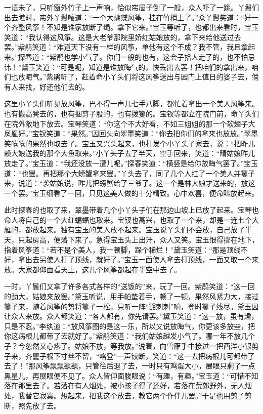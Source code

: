 \documentclass[12pt,oneside]{book}
\begin{document}
一语未了，只听窗外竹子上一声响，恰似帘屉子倒了一般，众人吓了一跳。丫鬟们出去瞧时，帘外丫鬟嚷道：“一个大蝴蝶风筝，挂在竹梢上了。”众丫鬟笑道：“好一个齐整风筝！不知是谁家放断了绳。拿下它来。”宝玉等听了，也都出来看时，宝玉笑道：“我认得这风筝。这是大老爷那院里娇红姑娘放的，拿下来给他送过去罢。”紫鹃笑道：“难道天下没有一样的风筝，单他有这个不成？我不管，我且拿起来。”探春道：“紫鹃也学小气了。你们一般的也有，这会子拾人走了的，也不怕忌讳！”黛玉笑道：“可是呢，知道是谁放晦气的，快丢出去罢！把咱们的拿出来，咱们也放晦气。”紫鹃听了，赶着命小丫头们将这风筝送出与园门上值日的婆子去，倘有人来找，好还他们去的。

这里小丫头们听见放风筝，巴不得一声儿七手八脚，都忙着拿出一个美人风筝来。也有搬高凳去的，也有捆剪子股的，也有拨籰的。宝钗等都立在院门前，命丫头们在院外敞地下放去。宝琴笑道：“你这个不大好看，不如三姐姐的那一个软翅子大凤凰好。”宝钗笑道：“果然。”因回头向翠墨笑道：“你去把你们的拿来也放放。”翠墨笑嘻嘻的果然也取去了。宝玉又兴头起来，也打发个小丫头子家去，说：“把昨儿赖大娘送我的那个大鱼取来。”小丫头子去了半天，空手回来，笑道：“晴姑娘昨儿放走了。”宝玉道：“我还没放一遭儿呢。”探春笑道：“横竖是给你放晦气罢了。”宝玉道：“也罢。再把那个大螃蟹拿来罢。”丫头去了，同了几个人扛了一个美人并籰子来，说道：“袭姑娘说，昨儿把螃蟹给了三爷了。这一个是林大娘才送来的，放这一个罢。”宝玉细看了一回，只见这美人做的十分精致。心中欢喜，便命叫放起来。

此时探春的也取了来，翠墨带着几个小丫头子们在那边山坡上已放了起来。宝琴也命人将自己的一个大红蝙蝠也取来。宝钗也高兴，也取了一个来，却是一连七个大雁的，都放起来。独有宝玉的美人放不起来。宝玉说丫头们不会放，自己放了半天，只起房高，便落下来了。急得宝玉头上出汗，众人又笑。宝玉恨得掷在地下，指着风筝道：“若不是个美人，我一顿脚，跺个稀烂！”黛玉笑道：“那是顶线不好，拿出去另使人打了顶线，就好了。”宝玉一面使人拿去打顶线，一面又取一个来放。大家都仰面看天上，这几个风筝都起在半空中去了。

一时，丫鬟们又拿了许多各式各样的“送饭的”来，玩了一回。紫鹃笑道：“这一回的劲大，姑娘来放罢。”黛玉听说，用手帕垫着手，顿了一顿，果然风紧力大，接过籰子来，随着风筝的势将籰子一松，只听一阵“豁刺刺”响，登时籰子线尽。黛玉因让众人来放。众人都笑道：“各人都有，你先请罢。”黛玉笑道：“这一放，虽有趣，只是不忍。”李纨道：“放风筝图的是这一乐，所以又说放晦气，你更该多放些，把你这病根儿都带了去就好了。”紫鹃笑道：“我们姑娘越发小气了。哪一年不放几个子？今忽然又心疼了。姑娘不放，等我放。”说着，向雪雁手中接过一把西洋小银剪子来，齐籰子根下寸丝不留，“咯登”一声铰断，笑道：“这一去把病根儿可都带了去了！”那风筝飘飘飖飖，只管往后退了去，一时只有鸡蛋大小，展眼只剩了一点黑星儿，再展眼便不见了。众人皆仰面脧眼说：“有趣，有趣。”宝玉道：“可惜不知落在那里去了。若落在有人烟处，被小孩子得了还好，若落在荒郊野外，无人烟处，我替它寂寞。想起来，把我这个放去，教它两个作伴儿罢。”于是也用剪子剪断，照先放了去。
\end{document}
